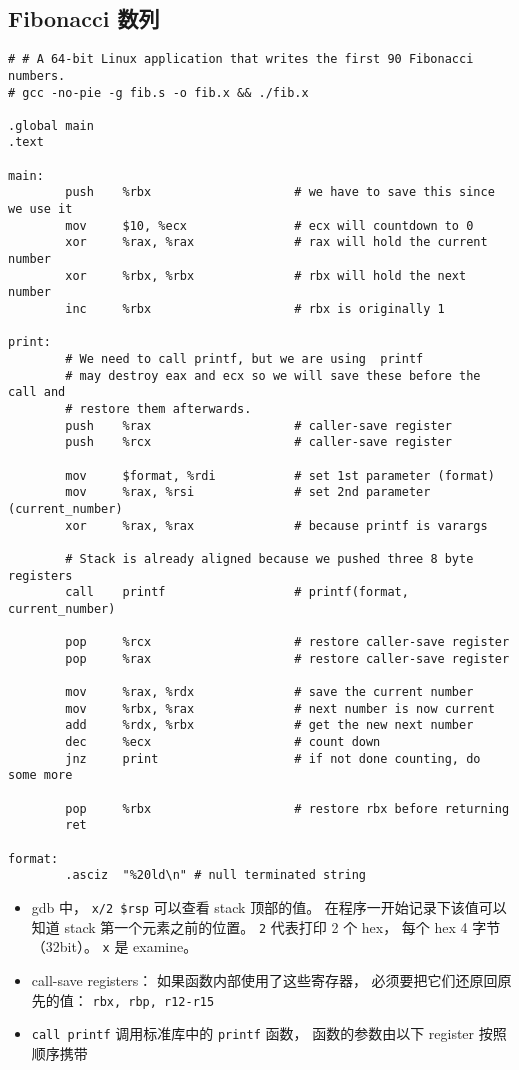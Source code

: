 \subsection{Fibonacci 数列}
\begin{lstlisting}[language=none, caption=fib.s]
# # A 64-bit Linux application that writes the first 90 Fibonacci numbers.
# gcc -no-pie -g fib.s -o fib.x && ./fib.x

.global main
.text

main:
        push    %rbx                    # we have to save this since we use it
        mov     $10, %ecx               # ecx will countdown to 0
        xor     %rax, %rax              # rax will hold the current number
        xor     %rbx, %rbx              # rbx will hold the next number
        inc     %rbx                    # rbx is originally 1

print:
        # We need to call printf, but we are using  printf
        # may destroy eax and ecx so we will save these before the call and
        # restore them afterwards.
        push    %rax                    # caller-save register
        push    %rcx                    # caller-save register

        mov     $format, %rdi           # set 1st parameter (format)
        mov     %rax, %rsi              # set 2nd parameter (current_number)
        xor     %rax, %rax              # because printf is varargs

        # Stack is already aligned because we pushed three 8 byte registers
        call    printf                  # printf(format, current_number)

        pop     %rcx                    # restore caller-save register
        pop     %rax                    # restore caller-save register

        mov     %rax, %rdx              # save the current number
        mov     %rbx, %rax              # next number is now current
        add     %rdx, %rbx              # get the new next number
        dec     %ecx                    # count down
        jnz     print                   # if not done counting, do some more

        pop     %rbx                    # restore rbx before returning
        ret

format:
        .asciz  "%20ld\n" # null terminated string
\end{lstlisting}

\begin{itemize}
\item gdb 中， \verb|x/2 $rsp| 可以查看 stack 顶部的值。 在程序一开始记录下该值可以知道 stack 第一个元素之前的位置。 \verb|2| 代表打印 2 个 hex， 每个 hex 4 字节（32bit）。 \verb|x| 是 examine。
\item call-save registers： 如果函数内部使用了这些寄存器， 必须要把它们还原回原先的值： \verb|rbx, rbp, r12-r15|
\item \verb|call printf| 调用标准库中的 \verb|printf| 函数， 函数的参数由以下 register 按照顺序携带
\end{itemize}
